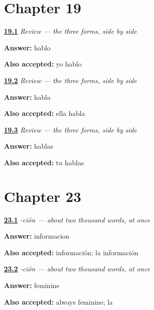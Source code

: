 \section*{Chapter 19}

\noindent\begin{minipage}[t]{\linewidth}
\raggedright
\hyperlink{review-ES-C06-ar-presente-mix-1}{\textbf{19.1}} \emph{Review — the three forms, side by side}\par
\small \textbf{Answer:} hablo\par
\footnotesize \textbf{Also accepted:} yo hablo
\end{minipage}\par\medskip

\noindent\begin{minipage}[t]{\linewidth}
\raggedright
\hyperlink{review-ES-C06-ar-presente-mix-2}{\textbf{19.2}} \emph{Review — the three forms, side by side}\par
\small \textbf{Answer:} habla\par
\footnotesize \textbf{Also accepted:} ella habla
\end{minipage}\par\medskip

\noindent\begin{minipage}[t]{\linewidth}
\raggedright
\hyperlink{review-ES-C06-ar-presente-mix-3}{\textbf{19.3}} \emph{Review — the three forms, side by side}\par
\small \textbf{Answer:} hablas\par
\footnotesize \textbf{Also accepted:} tu hablas
\end{minipage}\par\medskip

\section*{Chapter 23}

\noindent\begin{minipage}[t]{\linewidth}
\raggedright
\hyperlink{review-ES-C56-cion-make}{\textbf{23.1}} \emph{-ción — about two thousand words, at once}\par
\small \textbf{Answer:} informacion\par
\footnotesize \textbf{Also accepted:} información; la información
\end{minipage}\par\medskip

\noindent\begin{minipage}[t]{\linewidth}
\raggedright
\hyperlink{review-ES-C56-cion-gender}{\textbf{23.2}} \emph{-ción — about two thousand words, at once}\par
\small \textbf{Answer:} feminine\par
\footnotesize \textbf{Also accepted:} always feminine; la
\end{minipage}\par\medskip

